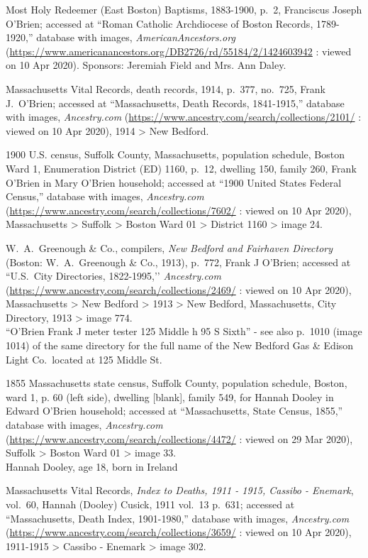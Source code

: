 \begin{thebibliography}{999}
	Most Holy Redeemer (East Boston) Baptisms, 1883-1900, p.\ 2, Franciscus Joseph O'Brien; accessed at ``Roman Catholic Archdiocese of Boston Records, 1789-1920,'' database with images, \textit{AmericanAncestors.org} (\url{https://www.americanancestors.org/DB2726/rd/55184/2/1424603942} : viewed on 10 Apr 2020).	
	Sponsors: Jeremiah Field and Mrs. Ann Daley.
	
	Massachusetts Vital Records, death records, 1914, p.\ 377, no.\ 725, Frank J.\ O'Brien; accessed at ``Massachusetts, Death Records, 1841-1915,'' database with images, \textit{Ancestry.com} (\url{https://www.ancestry.com/search/collections/2101/} : viewed on 10 Apr 2020), 1914 > New Bedford.
	
	1900 U.S. census, Suffolk County, Massachusetts, population schedule, Boston Ward 1, Enumeration District (ED) 1160, p.\ 12, dwelling 150, family 260, Frank O'Brien in Mary O'Brien household; accessed at ``1900 United States Federal Census,'' database with images, \textit{Ancestry.com} (\url{https://www.ancestry.com/search/collections/7602/} : viewed on 10 Apr 2020), Massachusetts > Suffolk > Boston Ward 01 > District 1160 > image 24.
	
	W.\ A.\ Greenough \& Co., compilers, \textit{New Bedford and Fairhaven Directory} (Boston: W.\ A.\ Greenough \& Co., 1913), p.\ 772, Frank J O'Brien; accessed at ``U.S.\ City Directories, 1822-1995,’’ \textit{Ancestry.com} (\url{https://www.ancestry.com/search/collections/2469/} : viewed on 10 Apr 2020), Massachusetts > New Bedford > 1913 > New Bedford, Massachusetts, City Directory, 1913 > image 774.\\
	``O'Brien Frank J meter tester 125 Middle h 95 S Sixth'' - see also p.\ 1010 (image 1014) of the same directory for the full name of the New Bedford Gas \& Edison Light Co.\ located at 125 Middle St.
	
	1855 Massachusetts state census, Suffolk County, population schedule, Boston, ward 1, p. 60 (left side), dwelling [blank], family 549, for Hannah Dooley in Edward O'Brien household; accessed at ``Massachusetts, State Census, 1855,'' database with images, \textit{Ancestry.com} (\url{https://www.ancestry.com/search/collections/4472/} : viewed on 29 Mar 2020), Suffolk > Boston Ward 01 > image 33.\\
	Hannah Dooley, age 18, born in Ireland
	
	Massachusetts Vital Records, \textit{Index to Deaths, 1911 - 1915, Cassibo - Enemark}, vol.\ 60, Hannah (Dooley) Cusick, 1911 vol.\ 13 p.\ 631; accessed at ``Massachusetts, Death Index, 1901-1980,'' database with images, \textit{Ancestry.com} (\url{https://www.ancestry.com/search/collections/3659/} : viewed on 10 Apr 2020), 1911-1915 > Cassibo - Enemark > image 302.
	

\end{thebibliography}
